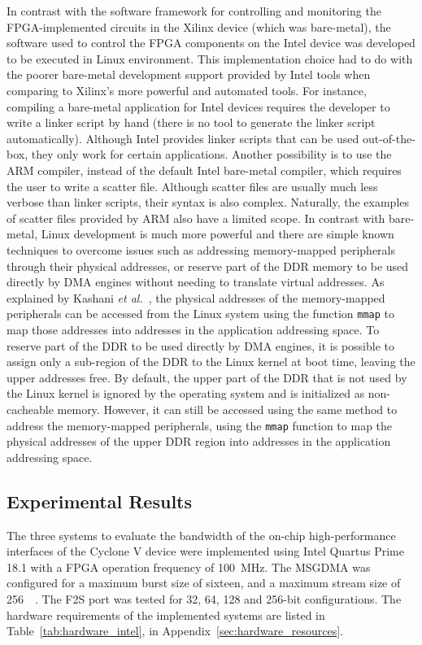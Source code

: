 In contrast with the software framework for controlling and monitoring the \ac{FPGA}-implemented circuits in the Xilinx device (which was bare-metal), the software used to control the \ac{FPGA} components on the Intel device was developed to be executed in Linux environment. This implementation choice had to do with the poorer bare-metal development support provided by Intel tools when comparing to Xilinx's more powerful and automated tools. For instance, compiling a bare-metal application for Intel devices requires the developer to write a linker script by hand (there is no tool to generate the linker script automatically). Although Intel provides linker scripts that can be used out-of-the-box, they only work for certain applications. Another possibility is to use the ARM compiler, instead of the default Intel bare-metal compiler, which requires the user to write a scatter file. Although scatter files are usually much less verbose than linker scripts, their syntax is also complex. Naturally, the examples of scatter files provided by ARM also have a limited scope. In contrast with bare-metal, Linux development is much more powerful and there are simple known techniques to overcome issues such as addressing memory-mapped peripherals through their physical addresses, or reserve part of the DDR memory to be used directly by \ac{DMA} engines without needing to translate virtual addresses. As explained by Kashani \textit{et al.}~\cite{sahandSoCTutorial}, the physical addresses of the memory-mapped peripherals can be accessed from the Linux system using the function \texttt{mmap} to map those addresses into addresses in the application addressing space. To reserve part of the DDR to be used directly by \ac{DMA} engines, it is possible to assign only a sub-region of the DDR to the Linux kernel at boot time, leaving the upper addresses free. By default, the upper part of the DDR that is not used by the Linux kernel is ignored by the operating system and is initialized as non-cacheable memory. However, it can still be accessed using the same method to address the memory-mapped peripherals, using the \texttt{mmap} function to map the physical addresses of the upper DDR region into addresses in the application addressing space.

\subsection{Experimental Results}

The three systems to evaluate the bandwidth of the on-chip high-performance interfaces of the Cyclone V device were implemented using Intel Quartus Prime 18.1 with a \ac{FPGA} operation frequency of \SI{100}{\mega\hertz}. The \ac{MSGDMA} was configured for a maximum burst size of sixteen, and a maximum stream size of \SI{256}{\mega\byte}. The \ac{F2S} port was tested for 32, 64, 128 and 256-bit configurations. The hardware requirements of the implemented systems are listed in Table~\ref{tab:hardware_intel}, in Appendix~\ref{sec:hardware_resources}.

